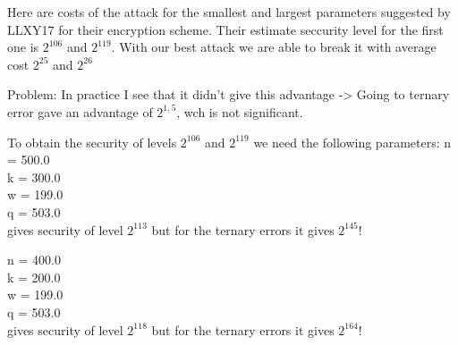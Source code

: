 \documentclass[12pt]{article}
\begin{document}
Here are costs of the attack for the smallest and largest parameters suggested by LLXY17 for their encryption scheme. Their estimate seccurity level for the first one is $2^{106}$ and $2^{119}$. With our best attack we are able to break it with average cost $2^{25}$ and $2^{26}$

Problem: In practice I see that it didn't give this advantage -> Going to ternary error gave an advantage of $2^{1,5}$, wch is not significant.

To obtain the security of levels $2^{106}$ and $2^{119}$ we need the following parameters:
n = 500.0 \\
k = 300.0 \\
w = 199.0 \\
q = 503.0 \\
gives security of level $2^{113}$ but for the ternary errors it gives $2^{145}$!

n = 400.0 \\
k = 200.0 \\
w = 199.0 \\
q = 503.0 \\
gives security of level $2^{118}$ but for the ternary errors it gives $2^{164}$!








\end{document}
